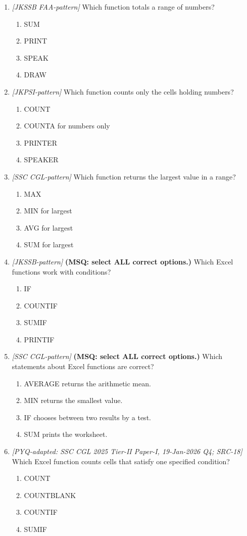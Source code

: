 \begin{enumerate}[label=\textbf{Q\arabic*.}, leftmargin=*]
\item \textit{[JKSSB FAA-pattern]} Which function totals a range of numbers?
  \begin{enumerate}[label=\Alph*.]
    \item SUM
    \item PRINT
    \item SPEAK
    \item DRAW
  \end{enumerate}
\item \textit{[JKPSI-pattern]} Which function counts only the cells holding numbers?
  \begin{enumerate}[label=\Alph*.]
    \item COUNT
    \item COUNTA for numbers only
    \item PRINTER
    \item SPEAKER
  \end{enumerate}
\item \textit{[SSC CGL-pattern]} Which function returns the largest value in a range?
  \begin{enumerate}[label=\Alph*.]
    \item MAX
    \item MIN for largest
    \item AVG for largest
    \item SUM for largest
  \end{enumerate}
\item \textit{[JKSSB-pattern]} \textbf{(MSQ: select ALL correct options.)} Which Excel functions work with conditions?
  \begin{enumerate}[label=\Alph*.]
    \item IF
    \item COUNTIF
    \item SUMIF
    \item PRINTIF
  \end{enumerate}
\item \textit{[SSC CGL-pattern]} \textbf{(MSQ: select ALL correct options.)} Which statements about Excel functions are correct?
  \begin{enumerate}[label=\Alph*.]
    \item AVERAGE returns the arithmetic mean.
    \item MIN returns the smallest value.
    \item IF chooses between two results by a test.
    \item SUM prints the worksheet.
  \end{enumerate}
\item \textit{[PYQ-adapted: SSC CGL 2025 Tier-II Paper-I, 19-Jan-2026 Q4; SRC-18]} Which Excel function counts cells that satisfy one specified condition?
  \begin{enumerate}[label=\Alph*.]
\item COUNT
   \item COUNTBLANK
   \item COUNTIF
   \item SUMIF
  \end{enumerate}


\end{enumerate}
